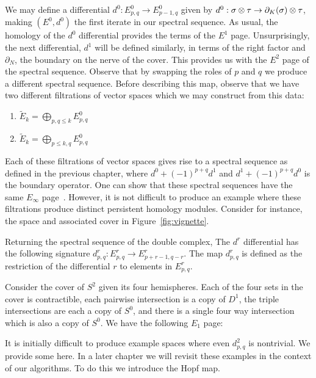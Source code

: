 We may define a differential $d^0: E^0_{p,q} \rightarrow E^0_{p-1,q}$ given by $d^0: \sigma \otimes \tau \rightarrow \partial_K(\sigma) \otimes \tau$, making $(E^0, d^0)$ the first iterate in our spectral sequence. As usual, the homology of the $d^0$ differential provides the terms of the $E^1$ page. Unsurprisingly, the next differential, $d^1$ will be defined similarly, in terms of the right factor and $\partial_N$, the boundary on the nerve of the cover. This provides us with the $E^2$ page of the spectral sequence. Observe that by swapping the roles of $p$ and $q$ we produce a different spectral sequence.
Before describing this map, observe that we have two different filtrations of vector spaces which we may construct from this data: 
\begin{enumerate}
\item $\tilde{E}_k = \bigoplus_{p, q \leq k} E^0_{p,q}$
\item $\tilde{E}_k = \bigoplus_{p \leq k, q} E^0_{p,q}$ 
\end{enumerate}
Each of these filtrations of vector spaces gives rise to a spectral sequence as defined in the previous chapter, where $d^0 + (-1)^{p+q}d^1$ and $d^1 + (-1)^{p+q}d^0$ is the boundary operator. One can show that these spectral sequences have the same $E_\infty$ page~\cite{mcleary}. However, it is not difficult to produce an example where these filtrations produce distinct persistent homology modules. Consider for instance, the space and associated cover in Figure~\ref{fig:vignette}. 

Returning the spectral sequence of the double complex, The $d^r$ differential has the following signature $d^r_{p,q}: E^r_{p,q} \rightarrow E^r_{p+r-1, q-r}$. The map $d^r_{p,q}$ is defined as the restriction of the differential $r$ to elements in $E^r_{p,q}$. 

\begin{example}
Consider the cover of $S^2$ given its four hemispheres. Each of the four sets in the cover is contractible, each pairwise intersection is a copy of $D^1$,  the triple intersections are each a copy of $S^0$, and there is a single four way intersection which is also a copy of $S^0$. We have the following $E_1$ page:

\end{example}

It is initially difficult to produce example spaces where even $d^2_{p,q}$ is nontrivial. We provide some here. In a later chapter we will revisit these examples in the context of our algorithms. To do this we introduce the Hopf map.

\begin{example}
\end{example}

